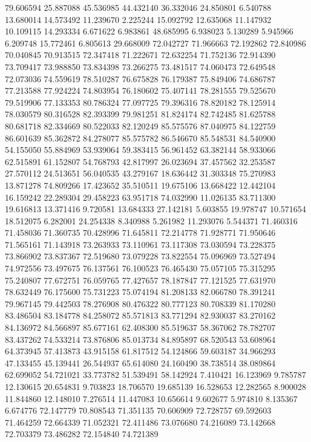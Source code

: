 79.606594
25.887088
45.536985
44.432140
36.332046
24.850801
6.540788
13.680014
14.573492
11.239670
2.225244
15.092792
12.635068
11.147932
10.109115
14.293334
6.671622
6.983861
48.685995
6.938023
5.130289
5.945966
6.209748
15.772461
6.805613
29.668009
72.042727
71.966663
72.192862
72.840986
70.040845
70.913515
72.347418
71.222671
72.632254
71.752136
72.914390
73.709417
73.988850
73.834398
73.266275
73.481517
74.060473
72.649548
72.073036
74.559619
78.510287
76.675828
76.179387
75.849406
74.686787
77.213588
77.924224
74.803954
76.180602
75.407141
78.281555
79.525670
79.519906
77.133353
80.786324
77.097725
79.396316
78.820182
78.125914
78.030579
80.316528
82.393399
79.981251
81.824174
82.742485
81.625788
80.681718
82.334669
80.522033
82.120249
85.575576
87.040975
84.122759
86.601639
85.362872
84.278077
85.575782
86.546670
85.548531
84.540900
54.155050
55.884969
53.939064
59.383415
56.961452
63.382144
58.933066
62.515891
61.152807
54.768793
42.817997
26.023694
37.457562
32.253587
27.570112
24.513651
56.040535
43.279167
18.636442
31.303348
75.270983
13.871278
74.809266
17.423652
35.510511
19.675106
13.668422
12.442104
16.159242
22.289304
29.458223
63.951718
74.032990
11.026135
83.711300
19.616813
13.371416
9.720581
13.684333
27.142181
5.603855
19.978747
10.571654
18.512075
6.282001
24.254338
8.340988
5.261982
11.293076
5.544371
71.460316
71.458036
71.360735
70.428996
71.645811
72.214778
71.928771
71.950646
71.565161
71.143918
73.263933
73.110961
73.117308
73.030594
73.228375
73.866902
73.837367
72.519680
73.079228
73.822554
75.096969
73.527494
74.972556
73.497675
76.137561
76.100523
76.465430
75.057105
75.315295
75.240807
77.672751
76.059765
77.427657
78.187847
77.121525
77.631970
78.632449
76.175600
75.731223
75.074194
81.208133
82.066780
78.391241
79.967145
79.442503
78.276908
80.476322
80.777123
80.708339
81.170280
83.486504
83.184778
84.258072
85.571813
83.771294
82.930037
83.270162
84.136972
84.566897
85.677161
62.408300
85.519637
58.367062
78.782707
83.437262
74.533214
73.876806
85.013734
84.895897
68.520543
53.608964
64.373945
57.413873
43.915158
61.817512
54.124866
59.603187
34.966293
47.133455
45.139441
26.544937
65.614080
24.160490
38.738514
38.089864
62.699052
54.721021
33.773782
51.539491
58.142924
7.410421
16.123969
9.785787
12.130615
20.654831
9.703823
18.706570
19.685139
16.528653
12.282565
8.900028
11.844860
12.148010
7.276514
11.447083
10.656614
9.602677
5.974810
8.135367
6.674776
72.147779
70.808543
71.351135
70.606909
72.728757
69.592603
71.464259
72.664339
71.052321
72.411486
73.076680
74.216089
73.142668
72.703379
73.486282
72.154840
74.721389
